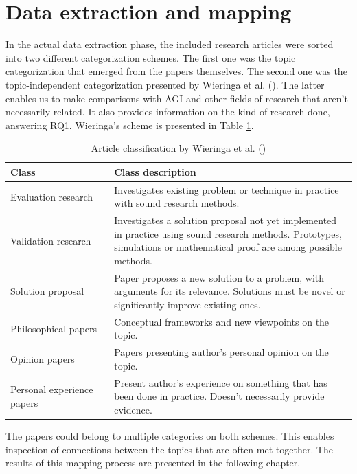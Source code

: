 \section{Data extraction and mapping}

In the actual data extraction phase, the included research articles were sorted
into two different categorization schemes. The first one was the topic
categorization that emerged from the papers themselves. The second one was
the topic-independent categorization presented by Wieringa et al.
(\cite*{wieringa2006}). The latter enables us to make comparisons with AGI and
other fields of research that aren't necessarily related. It also provides
information on the kind of research done, answering RQ1. Wieringa's scheme is
presented in Table \ref{table:wieringa}.

\begin{table}[H]
  \footnotesize
  \centering
  \begin{tabular}{p{0.30\linewidth} p{0.70\linewidth}}

    \textbf{Class}  & \textbf{Class description}  \\ \hline
    Evaluation research & Investigates existing problem or technique in practice with sound research methods. \\ \hline
    Validation research & Investigates a solution proposal not yet implemented in practice using sound research methods. Prototypes, simulations or mathematical proof are among possible methods. \\ \hline
    Solution proposal & Paper proposes a new solution to a problem, with arguments for its relevance. Solutions must be novel or significantly improve existing ones. \\ \hline
    Philosophical papers & Conceptual frameworks and new viewpoints on the topic. \\ \hline
    Opinion papers & Papers presenting author's personal opinion on the topic. \\ \hline
    Personal experience papers & Present author's experience on something that has been done in practice. Doesn't necessarily provide evidence. \\ \hline

  \end{tabular}
  \caption{Article classification by Wieringa et al. (\cite*{wieringa2006})}
  \label{table:wieringa}
\end{table}

The papers could belong to multiple categories on both schemes. This enables
inspection of connections between the topics that are often met together. The
results of this mapping process are presented in the following chapter.

